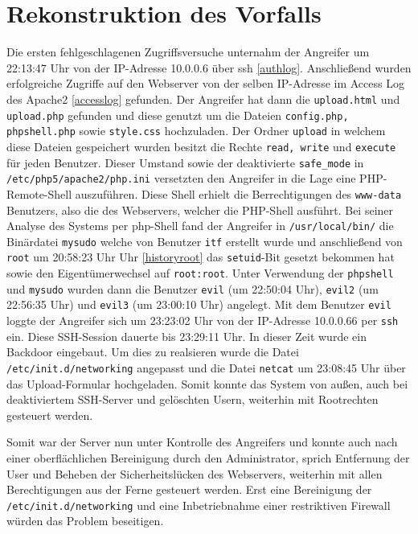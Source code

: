 \section{Rekonstruktion des Vorfalls}
Die ersten fehlgeschlagenen Zugriffsversuche unternahm der Angreifer um 22:13:47 Uhr von der IP-Adresse 10.0.0.6 über ssh \ref{authlog}.
Anschließend wurden erfolgreiche Zugriffe auf den Webserver von der selben IP-Adresse im Access Log des Apache2 \ref{accesslog} gefunden.
Der Angreifer hat dann die \texttt{upload.html} und \texttt{upload.php} gefunden und diese genutzt um die Dateien \texttt{config.php, phpshell.php} sowie \texttt{style.css} hochzuladen.
Der Ordner \linebreak \texttt{upload} in welchem diese Dateien gespeichert wurden besitzt die Rechte \texttt{read, write} und \texttt{execute} für jeden Benutzer. 
Dieser Umstand sowie der deaktivierte \texttt{safe\_mode} in \texttt{/etc/php5/apache2/php.ini} versetzten den \linebreak Angreifer in die Lage eine PHP-Remote-Shell auszuführen.
Diese Shell erhielt die Berrechtigungen des \texttt{www-data} Benutzers, also die des Webservers, welcher die PHP-Shell ausführt.
Bei seiner Analyse des Systems per php-Shell fand der Angreifer in \texttt{/usr/local/bin/} die Binärdatei \texttt{mysudo} welche von Benutzer \texttt{itf} erstellt wurde und anschließend von \texttt{root} um 20:58:23 Uhr Uhr \ref{historyroot} das \texttt{setuid}-Bit gesetzt bekommen hat sowie den Eigentümerwechsel auf \texttt{root:root}.
Unter Verwendung der \texttt{phpshell} und \texttt{mysudo} wurden dann die Benutzer \texttt{evil} (um 22:50:04 Uhr), \texttt{evil2} (um 22:56:35 Uhr) und \texttt{evil3} (um 23:00:10 Uhr) angelegt.
Mit dem Benutzer \texttt{evil} loggte der Angreifer sich um 23:23:02 Uhr von der IP-Adresse 10.0.0.66 per \texttt{ssh} ein.
Diese SSH-Session dauerte bis 23:29:11 Uhr.
In dieser Zeit wurde ein Backdoor eingebaut.
Um dies zu realsieren wurde die Datei \texttt{/etc/init.d/networking} angepasst und die Datei \texttt{netcat} um 23:08:45 Uhr über das Upload-Formular hochgeladen.
Somit konnte das System von außen, auch bei deaktiviertem SSH-Server und gelöschten Usern, weiterhin mit Rootrechten gesteuert werden.

Somit war der Server nun unter Kontrolle des Angreifers und konnte auch nach einer oberflächlichen Bereinigung durch den Administrator, sprich Entfernung der User und Beheben der Sicherheitslücken des Webservers, weiterhin mit allen Berechtigungen aus der Ferne gesteuert werden. Erst eine Bereinigung der \texttt{/etc/init.d/networking} und eine Inbetriebnahme einer restriktiven Firewall würden das Problem beseitigen.